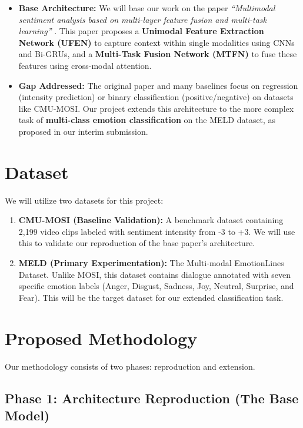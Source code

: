 \documentclass[11pt]{article}
\begin{document}
\begin{itemize}
    \item \textbf{Base Architecture:} We will base our work on the paper \textit{``Multimodal sentiment analysis based on multi-layer feature fusion and multi-task learning''} \citep{cai2025multimodal}. This paper proposes a \textbf{Unimodal Feature Extraction Network (UFEN)} to capture context within single modalities using CNNs and Bi-GRUs, and a \textbf{Multi-Task Fusion Network (MTFN)} to fuse these features using cross-modal attention.
    
    \item \textbf{Gap Addressed:} The original paper and many baselines focus on regression (intensity prediction) or binary classification (positive/negative) on datasets like CMU-MOSI. Our project extends this architecture to the more complex task of \textbf{multi-class emotion classification} on the MELD dataset, as proposed in our interim submission.
\end{itemize}

\section{Dataset}

We will utilize two datasets for this project:

\begin{enumerate}
    \item \textbf{CMU-MOSI (Baseline Validation):} A benchmark dataset containing 2,199 video clips labeled with sentiment intensity from -3 to +3. We will use this to validate our reproduction of the base paper's architecture.
    
    \item \textbf{MELD (Primary Experimentation):} The Multi-modal EmotionLines Dataset. Unlike MOSI, this dataset contains dialogue annotated with seven specific emotion labels (Anger, Disgust, Sadness, Joy, Neutral, Surprise, and Fear). This will be the target dataset for our extended classification task.
\end{enumerate}

\section{Proposed Methodology}

Our methodology consists of two phases: reproduction and extension.

\subsection{Phase 1: Architecture Reproduction (The Base Model)}
\end{document}
